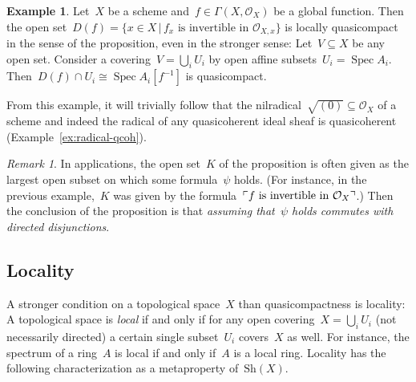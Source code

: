 \documentclass[10pt]{amsart}
\theoremstyle{definition}
\newtheorem{ex}[defn]{Example}
\theoremstyle{plain}
\theoremstyle{remark}
\newtheorem{rem}[defn]{Remark}
\renewcommand{\O}{\mathcal{O}}
\newcommand{\Sh}{\mathrm{Sh}}
\DeclareMathOperator{\Spec}{Spec}
\newcommand{\?}{\,{:}\,}
\renewcommand{\_}{\mathpunct{.}\,}
\newcommand{\speak}[1]{\ulcorner\text{\textnormal{#1}}\urcorner}
\begin{document}
\begin{ex}\label{ex:df-locally-compact}
Let~$X$ be a scheme and~$f \in \Gamma(X,\O_X)$ be a global function.
Then the open set~$D(f) = \{ x \in X \,|\, \text{$f_x$ is invertible in~$\O_{X,x}$}
\}$ is locally quasicompact in the sense of the proposition, even in the
stronger sense: Let~$V \subseteq X$ be any open set. Consider a covering~$V = \bigcup_i
U_i$ by open affine subsets~$U_i = \Spec A_i$. Then~$D(f) \cap U_i \cong \Spec
A_i[f^{-1}]$ is quasicompact.\end{ex}

From this example, it will trivially follow that the nilradical~$\sqrt{(0)}
\subseteq \O_X$ of a scheme and indeed the radical of any quasicoherent ideal
sheaf is quasicoherent (Example~\ref{ex:radical-qcoh}).

\begin{rem}In applications, the open set~$K$ of the proposition is often given
as the largest open subset on which some formula~$\psi$ holds. (For instance,
in the previous example,~$K$ was given by the formula~$\speak{$f$
is invertible in $\O_X$}$.)
Then the conclusion of the proposition is that \emph{assuming that~$\psi$ holds commutes
with directed disjunctions}.\end{rem}


\subsection{Locality}

A stronger condition on a topological space~$X$ than quasicompactness is
locality: A topological space is \emph{local} if and only if for any open
covering~$X = \bigcup_i U_i$ (not necessarily directed) a certain single subset~$U_i$
covers~$X$ as well. For instance, the spectrum of a ring~$A$ is local if and only
if~$A$ is a local ring. Locality has the following characterization as a metaproperty
of~$\Sh(X)$.
\end{document}
